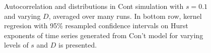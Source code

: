 \documentclass[runningheads]{llncs}
\begin{document}
\begin{figure}[htbp]
\begin{center}

    \caption{Autocorrelation and distributions in Cont simulation with $s=0.1$ and varying $D$, averaged over many runs. In bottom row, kernel regresion with 95\% resampled confidence intervals on Hurst exponents of time series generated from Con't model for varying levels of $s$ and $D$ is presented.}
    \label{fig:ContMultiRun}
  \end{center}
\end{figure}



\end{document}
